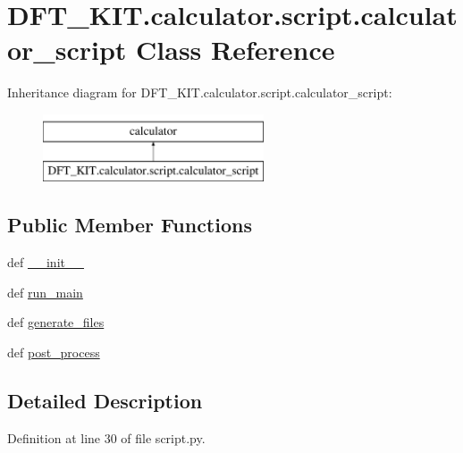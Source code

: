 \hypertarget{class_d_f_t___k_i_t_1_1calculator_1_1script_1_1calculator__script}{\section{D\+F\+T\+\_\+\+K\+I\+T.\+calculator.\+script.\+calculator\+\_\+script Class Reference}
\label{class_d_f_t___k_i_t_1_1calculator_1_1script_1_1calculator__script}
}
Inheritance diagram for D\+F\+T\+\_\+\+K\+I\+T.\+calculator.\+script.\+calculator\+\_\+script\+:\begin{figure}[H]
\begin{center}
\leavevmode
\includegraphics[height=2.000000cm]{class_d_f_t___k_i_t_1_1calculator_1_1script_1_1calculator__script}
\end{center}
\end{figure}
\subsection*{Public Member Functions}
\begin{DoxyCompactItemize}
\item 
def \hyperlink{class_d_f_t___k_i_t_1_1calculator_1_1script_1_1calculator__script_a79031df5c45b2f4ed5c692147f8ec27d}{\+\_\+\+\_\+init\+\_\+\+\_\+}
\item 
def \hyperlink{class_d_f_t___k_i_t_1_1calculator_1_1script_1_1calculator__script_a0cd1d0bc8e1ddbe9603ff68c83cb223b}{run\+\_\+main}
\item 
def \hyperlink{class_d_f_t___k_i_t_1_1calculator_1_1script_1_1calculator__script_a1242143a8e3270990a905ac548dc0203}{generate\+\_\+files}
\item 
def \hyperlink{class_d_f_t___k_i_t_1_1calculator_1_1script_1_1calculator__script_a85e472b18c63e3ede5d4e1a140bc4835}{post\+\_\+process}
\end{DoxyCompactItemize}


\subsection{Detailed Description}


Definition at line 30 of file script.\+py.



